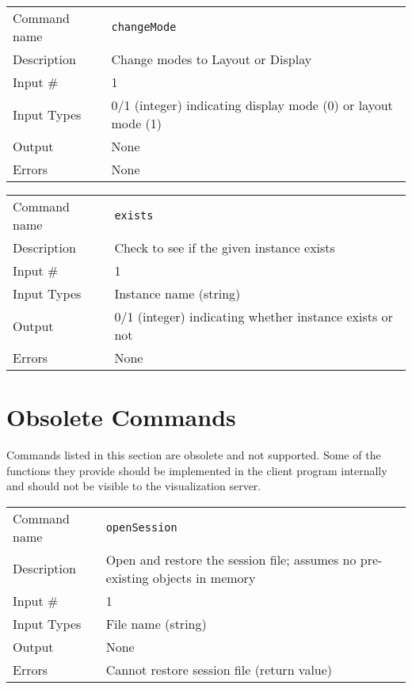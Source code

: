 \bigskip

\noindent
\begin{tabular}{l|p{5in}}
\hline
Command name & {\tt changeMode} \\
Description  & Change modes to Layout or Display \\
Input \#     & 1 \\
Input Types  & 0/1 (integer) indicating display mode (0) or layout mode (1) \\
Output       & None \\
Errors       & None \\
\hline
\end{tabular}

\bigskip

\noindent
\begin{tabular}{l|p{5in}}
\hline
Command name & {\tt exists} \\
Description  & Check to see if the given instance exists \\
Input \#     & 1 \\
Input Types  & Instance name (string) \\
Output       & 0/1 (integer) indicating whether instance exists or not \\
Errors       & None \\
\hline
\end{tabular}

\section{Obsolete Commands}

Commands listed in this section are obsolete and not supported. Some
of the functions they provide should be implemented in the client
program internally and should not be visible to the visualization
server.

\bigskip

\noindent
\begin{tabular}{l|p{5in}}
\hline
Command name & {\tt openSession} \\
Description  & Open and restore the session file; assumes no pre-existing
               objects in memory \\
Input \#     & 1 \\
Input Types  & File name (string) \\
Output       & None \\
Errors       & Cannot restore session file (return value) \\
\hline
\end{tabular}

